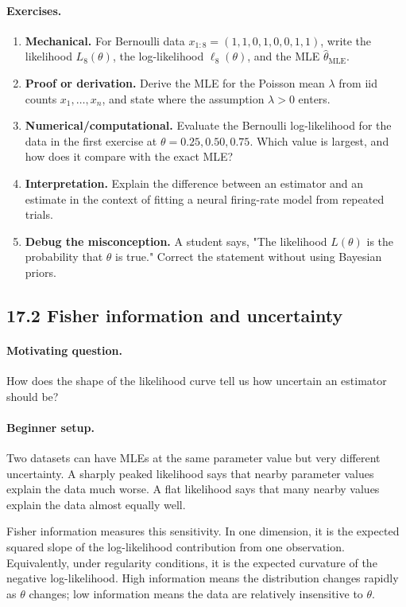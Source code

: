 \paragraph{Exercises.}
\begin{enumerate}[label=\textbf{17.1.\arabic*.}, leftmargin=*]
\item \textbf{Mechanical.} For Bernoulli data \(x_{1:8}=(1,1,0,1,0,0,1,1)\), write the likelihood \(L_8(\theta)\), the log-likelihood \(\ell_8(\theta)\), and the MLE \(\hat\theta_{\mathrm{MLE}}\).
\item \textbf{Proof or derivation.} Derive the MLE for the Poisson mean \(\lambda\) from iid counts \(x_1,\ldots,x_n\), and state where the assumption \(\lambda>0\) enters.
\item \textbf{Numerical/computational.} Evaluate the Bernoulli log-likelihood for the data in the first exercise at \(\theta=0.25,0.50,0.75\). Which value is largest, and how does it compare with the exact MLE?
\item \textbf{Interpretation.} Explain the difference between an estimator and an estimate in the context of fitting a neural firing-rate model from repeated trials.
\item \textbf{Debug the misconception.} A student says, "The likelihood \(L(\theta)\) is the probability that \(\theta\) is true." Correct the statement without using Bayesian priors.
\end{enumerate}

\subsection{17.2 Fisher information and uncertainty}

\paragraph{Motivating question.}
How does the shape of the likelihood curve tell us how uncertain an estimator should be?

\paragraph{Beginner setup.}
Two datasets can have MLEs at the same parameter value but very different uncertainty. A sharply peaked likelihood says that nearby parameter values explain the data much worse. A flat likelihood says that many nearby values explain the data almost equally well.

Fisher information measures this sensitivity. In one dimension, it is the expected squared slope of the log-likelihood contribution from one observation. Equivalently, under regularity conditions, it is the expected curvature of the negative log-likelihood. High information means the distribution changes rapidly as \(\theta\) changes; low information means the data are relatively insensitive to \(\theta\).

